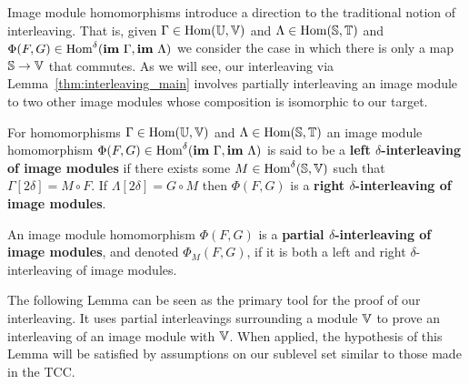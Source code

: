 Image module homomorphisms introduce a direction to the traditional notion of interleaving.
That is, given $\Gamma\in\mathrm{Hom}(\mathbb{U},\mathbb{V})$ and $\Lambda\in\mathrm{Hom}(\mathbb{S},\mathbb{T})$ and $\Phi(F, G)\in\mathrm{Hom}^\delta(\mathbf{im}~\Gamma, \mathbf{im}~\Lambda)$ we consider the case in which there is only a map $\mathbb{S}\to\mathbb{V}$ that commutes.
As we will see, our interleaving via Lemma~\ref{thm:interleaving_main} involves partially interleaving an image module to two other image modules whose composition is isomorphic to our target.

\begin{definition}
  For homomorphisms $\Gamma\in\mathrm{Hom}(\mathbb{U},\mathbb{V})$ and $\Lambda\in\mathrm{Hom}(\mathbb{S},\mathbb{T})$ an image module homomorphism $\Phi(F, G)\in\mathrm{Hom}^\delta(\mathbf{im}~\Gamma,\mathbf{im}~\Lambda)$ is said to be a \textbf{left $\delta$-interleaving of image modules} if there exists some $M\in\mathrm{Hom}^\delta(\mathbb{S},\mathbb{V})$ such that $\Gamma[2\delta] = M\circ F$.
  If $\Lambda[2\delta] = G\circ M$ then $\Phi(F, G)$ is a \textbf{right $\delta$-interleaving of image modules}.

  An image module homomorphism $\Phi(F, G)$ is a \textbf{partial $\delta$-interleaving of image modules}, and denoted $\Phi_M(F, G)$, if it is both a left and right $\delta$-interleaving of image modules.
\end{definition}

The following Lemma can be seen as the primary tool for the proof of our interleaving.
It uses partial interleavings surrounding a module $\mathbb{V}$ to prove an interleaving of an image module with $\mathbb{V}$.
When applied, the hypothesis of this Lemma will be satisfied by assumptions on our sublevel set similar to those made in the TCC.

